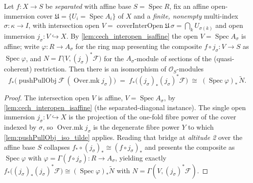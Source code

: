 \begin{lemma}\leanok
  \label{lem:coverinter_lhs_iso_tilde}
  Let \(f : X \to S\) be \emph{separated} with affine base \(S = \operatorname{Spec} R\), fix an
  affine open-immersion cover \(\mathfrak{U} = \{U_i = \operatorname{Spec} A_i\}\) of \(X\) and a
  \emph{finite, nonempty} multi-index \(\sigma : \kappa \to I\), with intersection open
  \(V = \operatorname{coverInterOpen}\mathfrak{U}\,\sigma = \bigcap_k U_{\sigma(k)}\) and open
  immersion \(j_\sigma : V \hookrightarrow X\). By \cref{lem:cech_interopen_isaffine} the open
  \(V = \operatorname{Spec} A_\sigma\) is affine; write \(\varphi : R \to A_\sigma\) for the ring
  map presenting the composite \(f \circ j_\sigma : V \to S\) as \(\operatorname{Spec}\varphi\),
  and \(N = \Gamma\bigl(V, (j_\sigma)^*\mathcal{F}\bigr)\) for the \(A_\sigma\)-module of sections
  of the (quasi-coherent) restriction. Then there is an isomorphism of
  \(\mathcal{O}_S\)-modules
  \[
    f_*\bigl(\operatorname{pushPullObj}\mathcal{F}\,(\operatorname{Over.mk} j_\sigma)\bigr)
      \;=\; f_*\bigl((j_\sigma)_* (j_\sigma)^*\mathcal{F}\bigr)
      \;\cong\; (\operatorname{Spec}\varphi)_*\,\widetilde{N}.
  \]
\end{lemma}
\begin{proof}
  The intersection open \(V\) is affine, \(V = \operatorname{Spec} A_\sigma\), by
  \cref{lem:cech_interopen_isaffine} (the separated-diagonal instance). The single open
  immersion \(j_\sigma : V \hookrightarrow X\) is the projection of the one-fold fibre power of
  the cover indexed by \(\sigma\), so \(\operatorname{Over.mk} j_\sigma\) is the degenerate fibre
  power \(Y\) to which \cref{lem:pushPullObj_iso_tilde} applies. Reading that bridge at
  \emph{altitude 2} over the affine base \(S\) collapses
  \(f_* \circ (j_\sigma)_* \cong (f \circ j_\sigma)_*\) and presents the composite as
  \(\operatorname{Spec}\varphi\) with \(\varphi = \Gamma(f \circ j_\sigma) : R \to A_\sigma\),
  yielding exactly
  \(f_*\bigl((j_\sigma)_*(j_\sigma)^*\mathcal{F}\bigr) \cong
  (\operatorname{Spec}\varphi)_*\widetilde{N}\) with
  \(N = \Gamma(V, (j_\sigma)^*\mathcal{F})\).
\end{proof}

